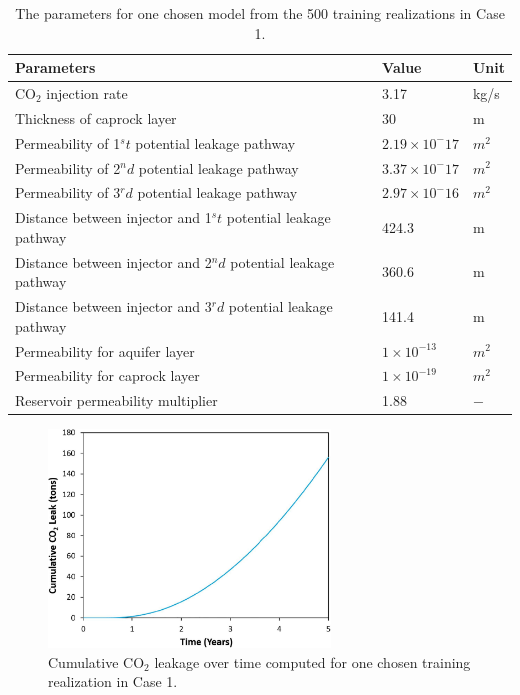 \documentclass[a4paper,fleqn]{cas-sc}
\begin{document}
\begin{table}[width=.9\linewidth,cols=3,pos=h]
    \caption{The parameters for one chosen model from the 500 training realizations in Case 1.}\label{tbl:2}
    \begin{tabular*}{\tblwidth}{@{} LLL@{} }
    \toprule
    \textbf{Parameters} & \textbf{Value} & \textbf{Unit}  \\
    \midrule
    CO$_2$ injection rate & 3.17 & kg/s \\
    Thickness of caprock layer & 30 & m \\
    Permeability of 1$^st$ potential leakage pathway & $2.19\times 10^-{17}$ & $m^2$ \\
    Permeability of 2$^nd$ potential leakage pathway & $3.37\times 10^-{17}$ & $m^2$ \\
    Permeability of 3$^rd$ potential leakage pathway & $2.97\times 10^-{16}$ & $m^2$ \\
    Distance between injector and 1$^st$ potential leakage pathway & 424.3 & m \\
    Distance between injector and 2$^nd$ potential leakage pathway & 360.6 & m \\
    Distance between injector and 3$^rd$ potential leakage pathway & 141.4 & m \\
    Permeability for aquifer layer & $1\times 10^{-13}$ & $m^2$ \\
    Permeability for caprock layer & $1\times 10^{-19}$ & $m^2$  \\
    Reservoir permeability multiplier & 1.88 & $-$   \\  
    \bottomrule
    \end{tabular*}
\end{table}

\begin{figure}
    \centering
    \includegraphics[width=7.5cm]{figs/Figure 8.pdf}
    \caption{Cumulative CO$_2$ leakage over time computed for one chosen training realization in Case 1.}
    \label{cum_leak_line}
\end{figure}
\end{document}
